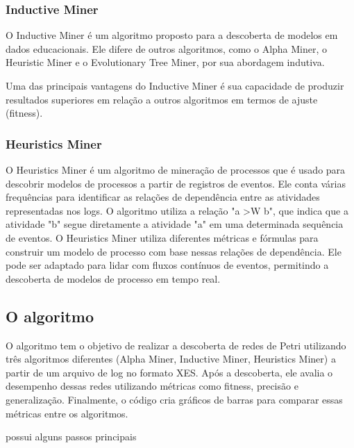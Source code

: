 \documentclass[tcc2]{classe_uftex/uftex}
\begin{document}
\subsubsection{Inductive Miner}

O Inductive Miner é um algoritmo proposto para a descoberta de modelos em dados educacionais. Ele difere de outros algoritmos, como o Alpha Miner, o Heuristic Miner e o Evolutionary Tree Miner, por sua abordagem indutiva.\cite{bogarin2018discovering}

Uma das principais vantagens do Inductive Miner é sua capacidade de produzir resultados superiores em relação a outros algoritmos em termos de ajuste (fitness).

\subsubsection{Heuristics Miner}

O Heuristics Miner é um algoritmo de mineração de processos que é usado para descobrir modelos de processos a partir de registros de eventos. Ele conta várias frequências para identificar as relações de dependência entre as atividades representadas nos logs. O algoritmo utiliza a relação "a >W b", que indica que a atividade "b" segue diretamente a atividade "a" em uma determinada sequência de eventos. O Heuristics Miner utiliza diferentes métricas e fórmulas para construir um modelo de processo com base nessas relações de dependência. Ele pode ser adaptado para lidar com fluxos contínuos de eventos, permitindo a descoberta de modelos de processo em tempo real.\cite{burattin2012heuristics}


\subsection{O algoritmo}

O algoritmo tem o objetivo de realizar a descoberta de redes de Petri utilizando três algoritmos diferentes (Alpha Miner, Inductive Miner, Heuristics Miner) a partir de um arquivo de log no formato XES. Após a descoberta, ele avalia o desempenho dessas redes utilizando métricas como fitness, precisão e generalização. Finalmente, o código cria gráficos de barras para comparar essas métricas entre os algoritmos.

possui alguns passos principais 
\end{document}
